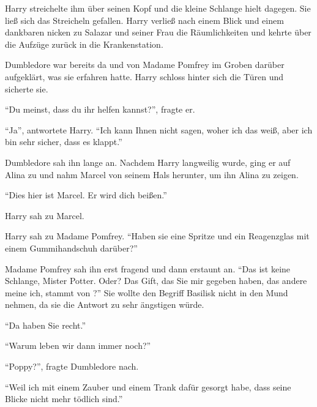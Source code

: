 




Harry streichelte ihm über seinen Kopf und die kleine Schlange hielt dagegen. Sie ließ sich das Streicheln gefallen. Harry verließ nach einem Blick und einem dankbaren nicken zu Salazar und seiner Frau die Räumlichkeiten und kehrte über die Aufzüge zurück in die Krankenstation.

Dumbledore war bereits da und von Madame Pomfrey im Groben darüber aufgeklärt, was sie erfahren hatte. Harry schloss hinter sich die Türen und sicherte sie.

\enquote{Du meinst, dass du ihr helfen kannst?}, fragte er.

\enquote{Ja}, antwortete Harry. \enquote{Ich kann Ihnen nicht sagen, woher ich das weiß, aber ich bin sehr sicher, dass es klappt.}

Dumbledore sah ihn lange an. Nachdem Harry langweilig wurde, ging er auf Alina zu und nahm Marcel von seinem Hals herunter, um ihn Alina zu zeigen.

\enquote{Dies hier ist Marcel. Er wird dich beißen.}


Harry sah zu Marcel. 


Harry sah zu Madame Pomfrey. \enquote{Haben sie eine Spritze und ein Reagenzglas mit einem Gummihandschuh darüber?}

Madame Pomfrey sah ihn erst fragend und dann erstaunt an. \enquote{Das ist keine Schlange, Mister Potter. Oder? Das Gift, das Sie mir gegeben haben, das andere meine ich, stammt von ?} Sie wollte den Begriff Basilisk nicht in den Mund nehmen, da sie die Antwort zu sehr ängstigen würde.

\enquote{Da haben Sie recht.}

\enquote{Warum leben wir dann immer noch?}

\enquote{Poppy?}, fragte Dumbledore nach.

\enquote{Weil ich mit einem Zauber und einem Trank dafür gesorgt habe, dass seine Blicke nicht mehr tödlich sind.}

